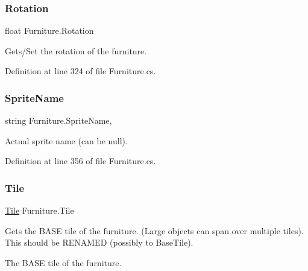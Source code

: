 \mbox{\label{class_furniture_ac5af988a7d8e9c91bd8f09ef6c9e95e7}} 
\subsubsection{\texorpdfstring{Rotation}{Rotation}}
{\footnotesize\ttfamily float Furniture.\+Rotation\hspace{0.3cm}{\ttfamily [get]}}



Gets/\+Set the rotation of the furniture. 



Definition at line 324 of file Furniture.\+cs.

\mbox{\label{class_furniture_a1a600b2226d319fcd75955b222abad03}} 
\subsubsection{\texorpdfstring{Sprite\+Name}{SpriteName}}
{\footnotesize\ttfamily string Furniture.\+Sprite\+Name\hspace{0.3cm}{\ttfamily [get]}, {\ttfamily [set]}}



Actual sprite name (can be null). 



Definition at line 356 of file Furniture.\+cs.

\mbox{\label{class_furniture_ac22ea3ffa9d94a5df9506fe619fed854}} 
\subsubsection{\texorpdfstring{Tile}{Tile}}
{\footnotesize\ttfamily \hyperlink{class_tile}{Tile} Furniture.\+Tile\hspace{0.3cm}{\ttfamily [get]}}



Gets the B\+A\+SE tile of the furniture. (Large objects can span over multiple tiles). This should be R\+E\+N\+A\+M\+ED (possibly to Base\+Tile). 

The B\+A\+SE tile of the furniture.

